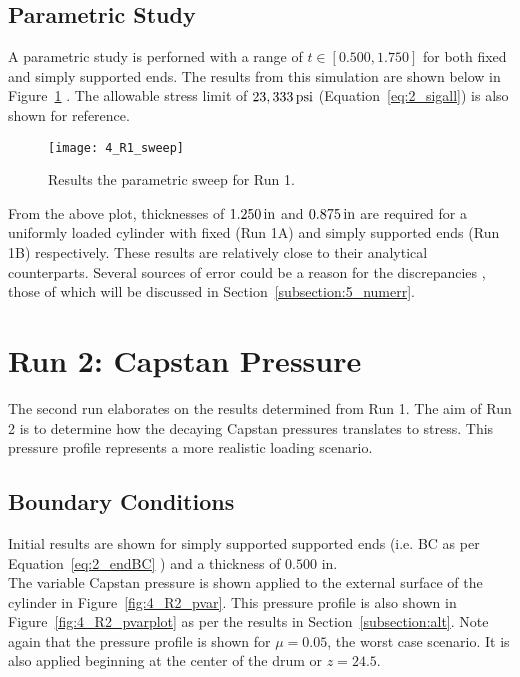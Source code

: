 \subsection{Parametric Study}

A parametric study is perforned with a range of $t \in [0.500, 1.750]$ for both fixed and simply supported ends. The results from this simulation are shown below in Figure~\ref{fig:4_R1_sweep} \cite{EXCEL}. The allowable stress limit of $23,333 \,\mathrm{psi}$ (Equation~\ref{eq:2_sigall}) is also shown for reference.

\begin{figure}[H]
	\centering
	\texttt{[image: 4\_R1\_sweep]}
	\caption{Results the parametric sweep for Run 1.}
	\label{fig:4_R1_sweep}
\end{figure}

From the above plot, thicknesses of $1.250 \,\mathrm{in}$ and $0.875\,\mathrm{in}$ are required for a uniformly loaded cylinder with fixed (Run 1A) and simply supported ends (Run 1B) respectively. These results are relatively close to their analytical counterparts. Several sources of error could be a reason for the discrepancies , those of which will be discussed in Section~\ref{subsection:5_numerr}.

\section{Run 2: Capstan Pressure}
\label{section:4_R2}
The second run elaborates on the results determined from Run 1. The aim of Run 2 is to determine how the decaying Capstan pressures translates to stress. This pressure profile represents a more realistic loading scenario.

\subsection{Boundary Conditions}

Initial results are shown for simply supported supported ends (i.e. BC as per Equation~\ref{eq:2_endBC} ) and a thickness of $0.500$ in.\\

The variable Capstan pressure is shown applied to the external surface of the cylinder in Figure~\ref{fig:4_R2_pvar}. This pressure profile is also shown in Figure~\ref{fig:4_R2_pvarplot} as per the results in Section~\ref{subsection:alt}. Note again that the pressure profile is shown for $\mu=0.05$, the worst case scenario. It is also applied beginning at the center of the drum or $z=24.5$.

